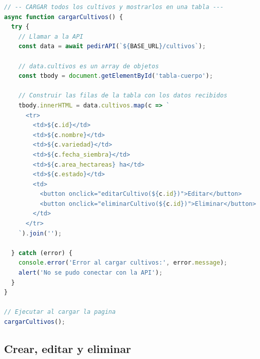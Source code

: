 \documentclass[12pt, a4paper]{article}
\begin{document}
\begin{tcolorbox}[codigoBox]
\begin{lstlisting}[style=jsStyle, language=JavaScript, morekeywords={async,await,const,let}]
// -- CARGAR todos los cultivos y mostrarlos en una tabla ---
async function cargarCultivos() {
  try {
    // Llamar a la API
    const data = await pedirAPI(`${BASE_URL}/cultivos`);

    // data.cultivos es un array de objetos
    const tbody = document.getElementById('tabla-cuerpo');

    // Construir las filas de la tabla con los datos recibidos
    tbody.innerHTML = data.cultivos.map(c => `
      <tr>
        <td>${c.id}</td>
        <td>${c.nombre}</td>
        <td>${c.variedad}</td>
        <td>${c.fecha_siembra}</td>
        <td>${c.area_hectareas} ha</td>
        <td>${c.estado}</td>
        <td>
          <button onclick="editarCultivo(${c.id})">Editar</button>
          <button onclick="eliminarCultivo(${c.id})">Eliminar</button>
        </td>
      </tr>
    `).join('');

  } catch (error) {
    console.error('Error al cargar cultivos:', error.message);
    alert('No se pudo conectar con la API');
  }
}

// Ejecutar al cargar la pagina
cargarCultivos();
\end{lstlisting}
\end{tcolorbox}

\subsection{Crear, editar y eliminar}
\end{document}
